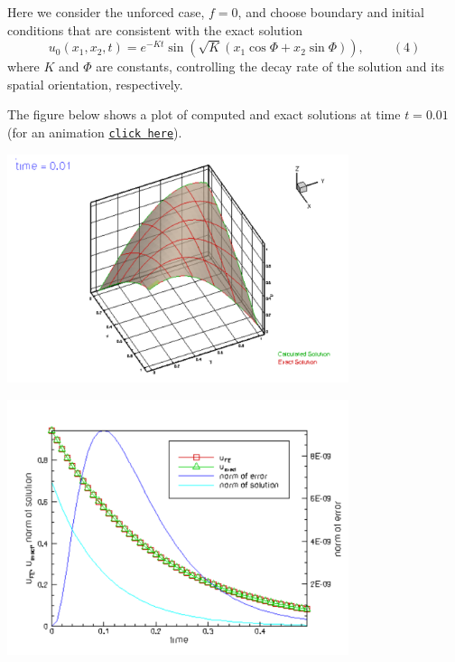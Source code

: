 Here we consider the unforced case, $ f=0 $, and choose boundary and initial conditions that are consistent with the exact solution \[ u_0(x_1,x_2,t) = e^{-Kt}\sin\left( \sqrt{K} \left( x_1 \cos \Phi + x_2 \sin \Phi\right)\right), \ \ \ \ \ \ \ \ \ \ (4) \] where $ K $ and $ \Phi $ are constants, controlling the decay rate of the solution and its spatial orientation, respectively.

The figure below shows a plot of computed and exact solutions at time $ t = 0.01 $ (for an animation \href{../figures/unsteady_heat_soln.avi}{\tt click here}).

 
\begin{DoxyImage}
\includegraphics[width=0.75\textwidth]{unsteady_heat_soln}
\end{DoxyImage}


 
\begin{DoxyImage}
\includegraphics[width=0.75\textwidth]{trace}
\end{DoxyImage}




